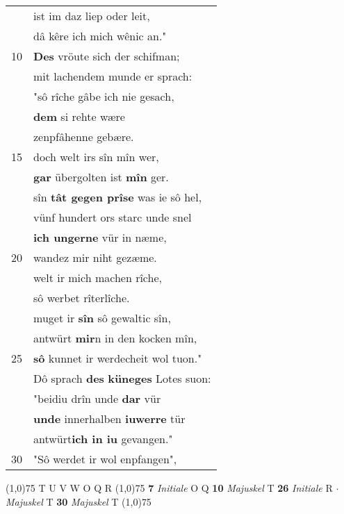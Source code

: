 \documentclass[8pt,a4paper,notitlepage]{article}
\begin{document}
\begin{table}[ht]
\begin{minipage}[t]{0.5\linewidth}
\begin{tabular}{rl}
 & ist im daz liep oder leit,\\ 
 & dâ kêre ich mich wênic an."\\ 
10 & \textbf{Des} vröute sich der schifman;\\ 
 & mit lachendem munde er sprach:\\ 
 & "sô rîche gâbe ich nie gesach,\\ 
 & \textbf{dem} si rehte wære\\ 
 & zenpfâhenne gebære.\\ 
15 & doch welt irs sîn mîn wer,\\ 
 & \textbf{gar} übergolten ist \textbf{mîn} ger.\\ 
 & sîn \textbf{tât gegen prîse} was ie sô hel,\\ 
 & vünf hundert ors starc unde snel\\ 
 & \textbf{ich ungerne} vür in næme,\\ 
20 & wandez mir niht gezæme.\\ 
 & welt ir mich machen rîche,\\ 
 & sô werbet rîterlîche.\\ 
 & muget ir \textbf{sîn} sô gewaltic sîn,\\ 
 & antwürt \textbf{mir}n in den kocken mîn,\\ 
25 & \textbf{sô} kunnet ir werdecheit wol tuon."\\ 
 & Dô sprach \textbf{des} \textbf{küneges} Lotes suon:\\ 
 & "beidiu drîn unde \textbf{dar} vür\\ 
 & \textbf{unde} innerhalben \textbf{iuwerre} tür\\ 
 & antwürt\textbf{ich in iu} gevangen."\\ 
30 & "Sô werdet ir wol enpfangen",\\ 
\end{tabular}
\scriptsize
\line(1,0){75} \newline
T U V W O Q R \newline
\line(1,0){75} \newline
\textbf{7} \textit{Initiale} O Q  \textbf{10} \textit{Majuskel} T  \textbf{26} \textit{Initiale} R   $\cdot$ \textit{Majuskel} T  \textbf{30} \textit{Majuskel} T  \newline
\line(1,0){75} \newline

\end{minipage}
\end{table}
\end{document}
